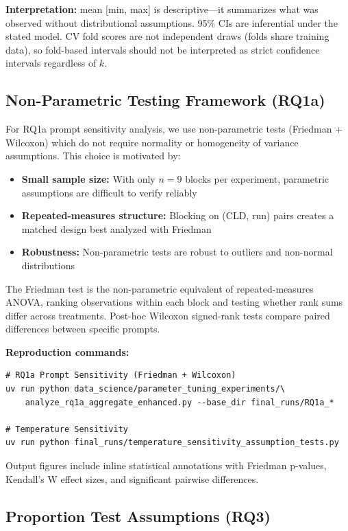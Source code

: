 \textbf{Interpretation:} mean [min, max] is descriptive---it summarizes what was observed without distributional assumptions. 95\% CIs are inferential under the stated model. CV fold scores are not independent draws (folds share training data), so fold-based intervals should not be interpreted as strict confidence intervals regardless of $k$.

\subsection{Non-Parametric Testing Framework (RQ1a)}

For RQ1a prompt sensitivity analysis, we use non-parametric tests (Friedman + Wilcoxon) which do not require normality or homogeneity of variance assumptions. This choice is motivated by:
\begin{itemize}[noitemsep]
    \item \textbf{Small sample size:} With only $n=9$ blocks per experiment, parametric assumptions are difficult to verify reliably
    \item \textbf{Repeated-measures structure:} Blocking on (CLD, run) pairs creates a matched design best analyzed with Friedman
    \item \textbf{Robustness:} Non-parametric tests are robust to outliers and non-normal distributions
\end{itemize}

The Friedman test is the non-parametric equivalent of repeated-measures ANOVA, ranking observations within each block and testing whether rank sums differ across treatments. Post-hoc Wilcoxon signed-rank tests compare paired differences between specific prompts.

\textbf{Reproduction commands:}
\begin{verbatim}
# RQ1a Prompt Sensitivity (Friedman + Wilcoxon)
uv run python data_science/parameter_tuning_experiments/\
    analyze_rq1a_aggregate_enhanced.py --base_dir final_runs/RQ1a_*

# Temperature Sensitivity
uv run python final_runs/temperature_sensitivity_assumption_tests.py
\end{verbatim}

Output figures include inline statistical annotations with Friedman p-values, Kendall's W effect sizes, and significant pairwise differences.

\subsection{Proportion Test Assumptions (RQ3)}

